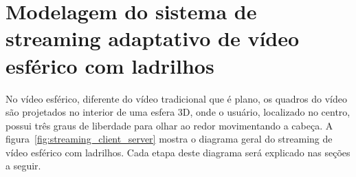 


\chapter{Modelagem do sistema de streaming adaptativo de vídeo esférico com ladrilhos}\label{Cap:Problem Design}

No vídeo esférico, diferente do vídeo tradicional que é plano, os quadros do vídeo são projetados no interior de uma esfera 3D, onde o usuário, localizado no centro, possui três graus de liberdade para olhar ao redor movimentando a cabeça. A figura~\ref{fig:streaming_client_server} mostra o diagrama geral do streaming de vídeo esférico com ladrilhos. Cada etapa deste diagrama será explicado nas seções a seguir. 


